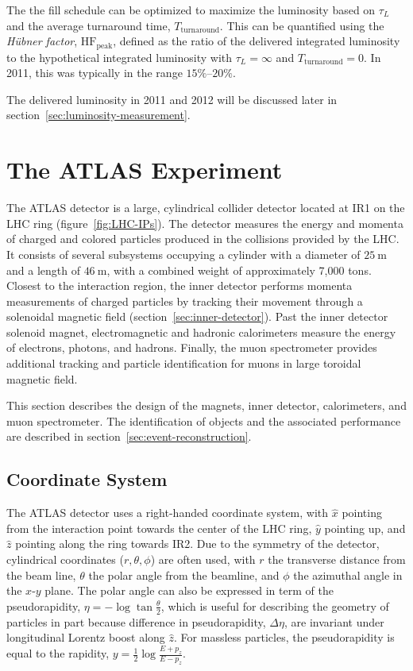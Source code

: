 \begin{itemize}
	The the fill schedule can be optimized to maximize the luminosity based on $\tau_L$ and the average turnaround time, $T_{\mathrm{turnaround}}$. This can be quantified using the \emph{H{\"u}bner factor}, $\mathrm{HF}_{\mathrm{peak}}$, defined as the ratio of the delivered integrated luminosity to the hypothetical integrated luminosity with $\tau_L=\infty$ and $T_{\mathrm{turnaround}}=0$. In 2011, this was typically in the range $15\%$--$20\%$.
\end{itemize}

The delivered luminosity in 2011 and 2012 will be discussed later in section~\ref{sec:luminosity-measurement}.


\section{The ATLAS Experiment}\label{sec:the-atlas-experiment}

The ATLAS detector is a large, cylindrical collider detector located at IR1 on the LHC ring (figure~\ref{fig:LHC-IPs}). The detector measures the energy and momenta of charged and colored particles produced in the collisions provided by the LHC. It consists of several subsystems occupying a cylinder with a diameter of $25~\mbox{m}$ and a length of $46~\mbox{m}$, with a combined weight of approximately 7,000 tons. Closest to the interaction region, the inner detector performs momenta measurements of charged particles by tracking their movement through a solenoidal magnetic field (section~\ref{sec:inner-detector}). Past the inner detector solenoid magnet, electromagnetic and hadronic calorimeters measure the energy of electrons, photons, and hadrons. Finally, the muon spectrometer provides additional tracking and particle identification for muons in large toroidal magnetic field. 

This section describes the design of the magnets, inner detector, calorimeters, and muon spectrometer. The identification of objects and the associated performance are described in section~\ref{sec:event-reconstruction}. 

\subsection{Coordinate System}\label{sec:ATLAS-coordinate-system}

The ATLAS detector uses a right-handed coordinate system, with $\hat{x}$ pointing from the interaction point towards the center of the LHC ring, $\hat{y}$ pointing up, and $\hat{z}$ pointing along the ring towards IR2. Due to the symmetry of the detector, cylindrical coordinates ($r,\theta,\phi$) are often used, with $r$ the transverse distance from the beam line, $\theta$ the polar angle from the beamline, and $\phi$ the azimuthal angle in the $x$-$y$ plane. The polar angle can also be expressed in term of the pseudorapidity, $\eta = -\log \tan \frac{\theta}{2}$, which is useful for describing the geometry of particles in part because difference in pseudorapidity, $\Delta\eta$, are invariant under longitudinal Lorentz boost along $\hat{z}$. For massless particles, the pseudorapidity is equal to the rapidity, $y=\frac12 \log \frac{E+p_z}{E-p_z}$. 

